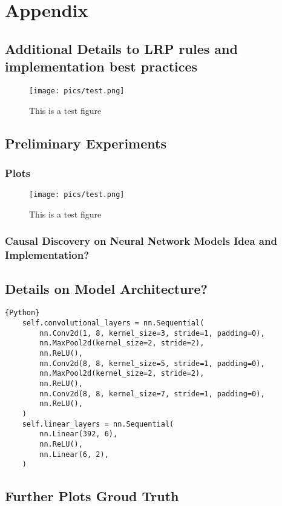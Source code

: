 \chapter{Appendix}\label{chapter:Appendix}


\section{Additional Details to LRP rules and implementation best practices}
\begin{figure}[ht]
	\centering
	\label{fig:tesfigure}
	\texttt{[image: pics/test.png]}
	\caption[Test Figure]{This is a test figure}
\end{figure}

\section{Preliminary Experiments}
\subsection{Plots}
\begin{figure}[ht]
	\centering
	\label{fig:blafigure}
	\texttt{[image: pics/test.png]}
	\caption[Test Figure 2]{This is a test figure}
\end{figure}
\subsection{Causal Discovery on Neural Network Models Idea and Implementation?}


\section{Details on Model Architecture?}

\begin{lstlisting}{Python}
	self.convolutional_layers = nn.Sequential(
		nn.Conv2d(1, 8, kernel_size=3, stride=1, padding=0),
		nn.MaxPool2d(kernel_size=2, stride=2),
		nn.ReLU(),
		nn.Conv2d(8, 8, kernel_size=5, stride=1, padding=0),
		nn.MaxPool2d(kernel_size=2, stride=2),
		nn.ReLU(),
		nn.Conv2d(8, 8, kernel_size=7, stride=1, padding=0),
		nn.ReLU(),
	)
	self.linear_layers = nn.Sequential(
		nn.Linear(392, 6),
		nn.ReLU(),
		nn.Linear(6, 2),
	)
\end{lstlisting}

\section{Further Plots Groud Truth}
